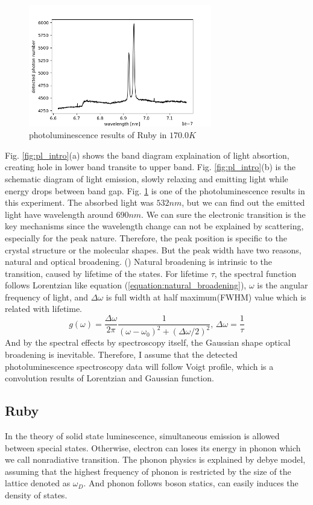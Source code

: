 \documentclass{article}
\begin{document}
 \begin{figure}[ht]
    \centering
    \includegraphics[width=8cm]{../results/Ruby(170.0)_raw_fig.png}
    \caption{photoluminescence results of Ruby in $170.0K$}
    \label{fig:pl_sample}
 \end{figure}
 Fig. \ref{fig:pl_intro}(a) shows the band diagram explaination of light absortion, creating hole in lower band transite to upper band.
 Fig. \ref{fig:pl_intro}(b) is the schematic diagram of light emission, slowly relaxing and emitting light while energy drops between band gap.
 Fig. \ref{fig:pl_sample} is one of the photoluminescence results in this experiment.
 The absorbed light was $532nm$, but we can find out the emitted light have wavelength around $690nm$.
 We can sure the electronic transition is the key mechanisms since the wavelength change can not be explained by scattering, especially for the peak nature.
 Therefore, the peak position is specific to the crystal structure or the molecular shapes.
 But the peak width have two reasons, natural and optical broadening. (\cite{quantum_optics})
 Natural broadening is intrinsic to the transition, caused by lifetime of the states.
 For lifetime $\tau$, the spectral function follows Lorentzian like equation (\ref{equation:natural_broadening}), $\omega$ is the angular frequency of light, and $\Delta \omega$ is full width at half maximum(FWHM) value which is related with lifetime.
 \begin{equation}
   g(\omega) = \frac{\Delta \omega}{2 \pi} \frac{1}{(\omega-\omega_0)^2 + (\Delta \omega/2)^2},\, \Delta \omega = \frac{1}{\tau}
   \label{equation:natural_broadening}
 \end{equation}
 And by the spectral effects by spectroscopy itself, the Gaussian shape optical broadening is inevitable.
 Therefore, I assume that the detected photoluminescence spectroscopy data will follow Voigt profile, which is a convolution results of Lorentzian and Gaussian function.


 \subsection{Ruby}
 \label{intro:ruby}
 In the theory of solid state luminescence, simultaneous emission is allowed between special states.
 Otherwise, electron can loses its energy in phonon which we call nonradiative transition.
 The phonon physics is explained by debye model, assuming that the highest frequency of phonon is restricted by the size of the lattice denoted as $\omega_D$.
 And phonon follows boson statics, can easily induces the density of states.
 
\end{document}
